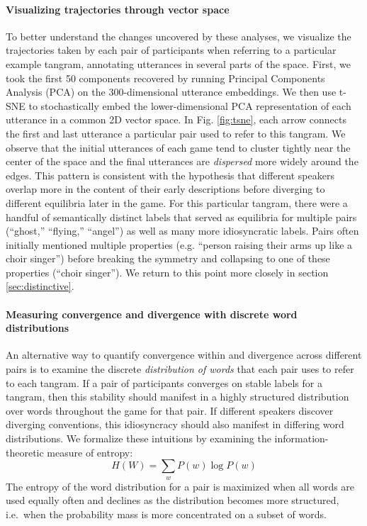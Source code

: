 \paragraph{Visualizing trajectories through vector space}  
To better understand the changes uncovered by these analyses, we visualize the trajectories taken by each pair of participants when referring to a particular example tangram, annotating utterances in several parts of the space.
First, we took the first 50 components recovered by running Principal Components Analysis (PCA) on the 300-dimensional utterance embeddings. 
We then use t-SNE \cite{maaten2008visualizing} to stochastically embed the lower-dimensional PCA representation of each utterance in a common 2D vector space. 
In Fig. \ref{fig:tsne}, each arrow connects the first and last utterance a particular pair used to refer to this tangram.
We observe that the initial utterances of each game tend to cluster tightly near the center of the space and the final utterances are \emph{dispersed} more widely around the edges. 
This pattern is consistent with the hypothesis that different speakers overlap more in the content of their early descriptions before diverging to different equilibria later in the game.
For this particular tangram, there were a handful of semantically distinct labels that served as equilibria for multiple pairs (``ghost,'' ``flying,'' ``angel'') as well as many more idiosyncratic labels.
Pairs often initially mentioned multiple properties (e.g. ``person raising their arms up like a choir singer'') before breaking the symmetry and collapsing to one of these properties (``choir singer'').
We return to this point more closely in section \ref{sec:distinctive}.

\paragraph{Measuring convergence and divergence with discrete word distributions}

An alternative way to quantify convergence within and divergence across different pairs is to examine the discrete \emph{distribution of words} that each pair uses to refer to each tangram.
If a pair of participants converges on stable labels for a tangram, then this stability should manifest in a highly structured distribution over words throughout the game for that pair.
If different speakers discover diverging conventions, this idiosyncracy should also manifest in differing word distributions.
We formalize these intuitions by examining the information-theoretic measure of entropy: $$H(W) = \sum_w P(w) \log P(w)$$
The entropy of the word distribution for a pair is maximized when all words are used equally often and declines as the distribution becomes more structured, i.e.~when the probability mass is more concentrated on a subset of words.

